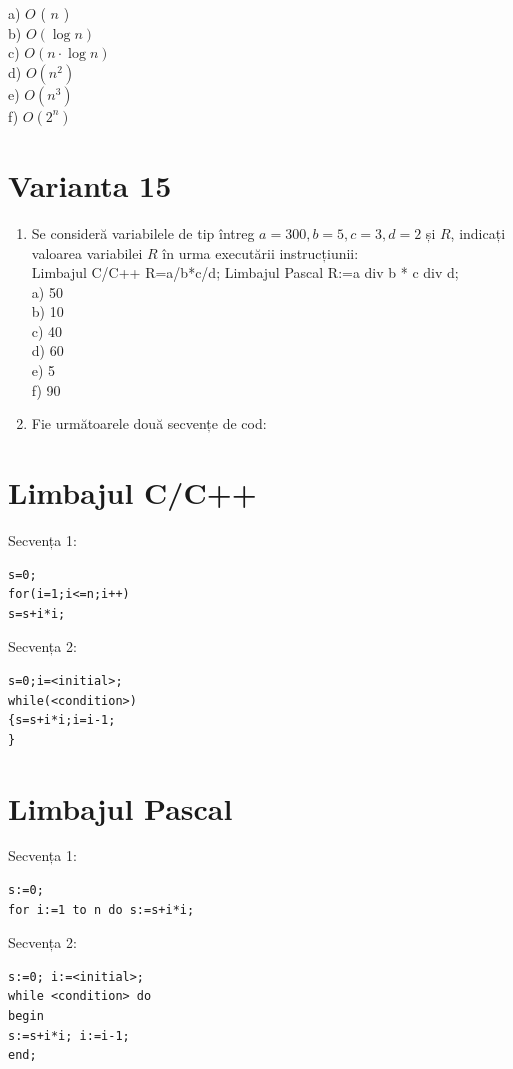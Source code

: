 \documentclass[10pt]{article}
\begin{document}
a) $O$ ( $n$ )\\
b) $O(\log n)$\\
c) $O(n \cdot \log n)$\\
d) $O\left(n^{2}\right)$\\
e) $O\left(n^{3}\right)$\\
f) $O\left(2^{n}\right)$

\section*{Varianta 15}
\begin{enumerate}
  \item Se consideră variabilele de tip întreg $a=300, b=5, c=3, d=2$ și $R$, indicați valoarea variabilei $R$ în urma executării instrucțiunii:\\
Limbajul C/C++ R=a/b*c/d; Limbajul Pascal R:=a div b * c div d;\\
a) 50\\
b) 10\\
c) 40\\
d) 60\\
e) 5\\
f) 90
  \item Fie următoarele două secvențe de cod:
\end{enumerate}

\section*{Limbajul C/C++}
Secvența 1:

\begin{verbatim}
s=0;
for(i=1;i<=n;i++)
s=s+i*i;
\end{verbatim}

Secvența 2:

\begin{verbatim}
s=0;i=<initial>;
while(<condition>)
{s=s+i*i;i=i-1;
}
\end{verbatim}

\section*{Limbajul Pascal}
Secvența 1:

\begin{verbatim}
s:=0;
for i:=1 to n do s:=s+i*i;
\end{verbatim}

Secvența 2:

\begin{verbatim}
s:=0; i:=<initial>;
while <condition> do
begin
s:=s+i*i; i:=i-1;
end;
\end{verbatim}
\end{document}
